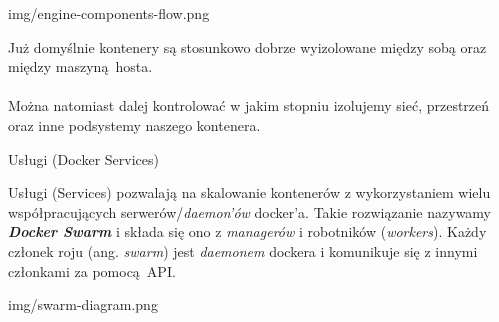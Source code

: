 \documentclass[aspectratio=169]{beamer}
\begin{document}
\begin{frameImg}[\textwidth]{img/engine-components-flow.png}
\end{frameImg}

\begin{frame}
    \begin{card}
        Już domyślnie kontenery są stosunkowo dobrze wyizolowane między sobą oraz między maszyną hosta.\\\\
        Można natomiast dalej kontrolować w jakim stopniu izolujemy sieć, przestrzeń oraz inne podsystemy naszego kontenera.
    \end{card}
\end{frame}

\begin{frame}{Usługi (Docker Services)}
    \begin{card}
        Usługi (Services) pozwalają na skalowanie kontenerów z wykorzystaniem wielu współpracujących serwerów/\textit{daemon'ów} docker'a.
        Takie rozwiązanie nazywamy \textbf{\textit{Docker Swarm}} i składa się ono z \textit{managerów} i robotników (\textit{workers}).
        Każdy członek roju (ang. \textit{swarm}) jest \textit{daemonem} dockera i komunikuje się z innymi członkami za pomocą API.
    \end{card}
\end{frame}

\begin{frameImg}[\textwidth]{img/swarm-diagram.png}
\end{frameImg}
\end{document}
